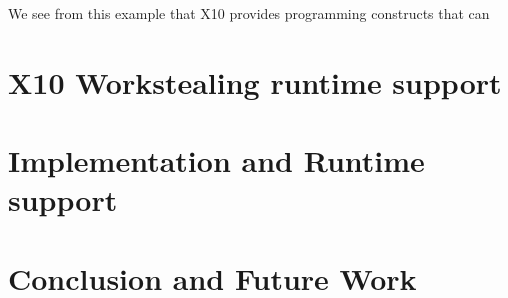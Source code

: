 \documentclass{llncs}
\begin{document}
We see from this example that X10 provides programming constructs that can 


\section{X10  Workstealing runtime support}
\label{s:runtime}

\section{Implementation and Runtime support }
\label{s:results}

\section{Conclusion and Future Work}
\label{s:concl}


\end{document}
